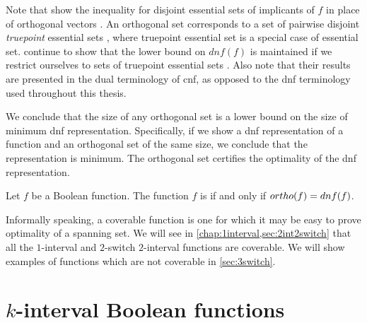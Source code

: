 Note that \citeauthor{Cepek2012}
show the inequality
for disjoint essential sets of implicants of $f$
in place of orthogonal vectors
\citep[Theorem 2.8]{Cepek2012}. %
An orthogonal set corresponds
to a set of pairwise disjoint
\emph{truepoint} essential sets
\citep[Section 3]{Cepek2012}, %
where truepoint essential set
is a special case of essential set.
\citeauthor{Cepek2012} continue to
show that the lower bound on $dnf(f)$ is maintained
if we restrict ourselves
to sets of truepoint essential sets
\citep[Corollary 3.2]{Cepek2012}. %
Also note that their results are presented in the dual
terminology of \acrfull{cnf},
as opposed to the \acrshort{dnf} terminology
used throughout this thesis.

We conclude that the size of any orthogonal set
is a lower bound on the size of minimum
\acrshort{dnf} representation.
Specifically,
if we show a \acrshort{dnf} representation of a function
and an orthogonal set of the same size,
we conclude that the representation is minimum.
The orthogonal set certifies
the optimality of the \acrshort{dnf} representation.

\begin{definition}
\label{def:coverable}
Let $f$ be a Boolean function.
The function $f$ is 
if and only if
$ortho (f) = dnf (f)$.
\end{definition}

Informally speaking,
a coverable function is one for which it may be
easy to prove optimality of a spanning set.
We will see
in \cref{chap:1interval,sec:2int2switch}
that all the $1$-interval
and $2$-switch $2$-interval functions
are coverable.
We will show examples of functions which are not coverable
in \cref{sec:3switch}.

\section{\texorpdfstring{$k$}{k}-interval
Boolean functions}

